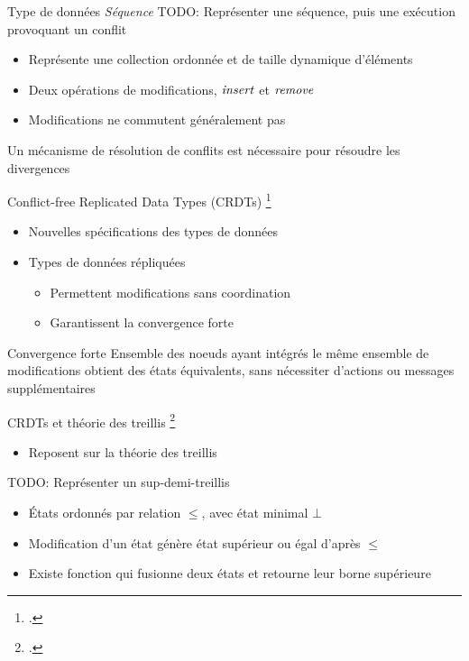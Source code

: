 \begin{frame}{Type de données \emph{Séquence}}
    TODO: Représenter une séquence, puis une exécution provoquant un conflit
    \begin{itemize}
        \item Représente une collection ordonnée et de taille dynamique d'éléments
        \item Deux opérations de modifications, $\mathit{insert}$ et $\mathit{remove}$
        \item Modifications ne commutent généralement pas
    \end{itemize}
    Un mécanisme de résolution de conflits est nécessaire pour résoudre les divergences
\end{frame}

\begin{frame}{Conflict-free Replicated Data Types (CRDTs) \footcite{shapiro_2011_crdt}}
    \begin{itemize}
        \item Nouvelles spécifications des types de données
        \item Types de données répliquées
        \begin{itemize}
            \item Permettent modifications sans coordination
            \item Garantissent la convergence forte
        \end{itemize}
    \end{itemize}
    \begin{alertblock}{Convergence forte}
        Ensemble des noeuds ayant intégrés le même ensemble de modifications obtient des états équivalents, sans nécessiter d'actions ou messages supplémentaires
    \end{alertblock}
\end{frame}

\begin{frame}{CRDTs et théorie des treillis \footcite{2002-intro-lattices-order-davey}}
    \begin{itemize}
        \item Reposent sur la théorie des treillis
    \end{itemize}
    TODO: Représenter un sup-demi-treillis
    \begin{itemize}
        \item États ordonnés par relation $\leq$, avec état minimal $\bot$
        \item Modification d'un état génère état supérieur ou égal d'après $\leq$
        \item Existe fonction qui fusionne deux états et retourne leur borne supérieure
    \end{itemize}
\end{frame}

